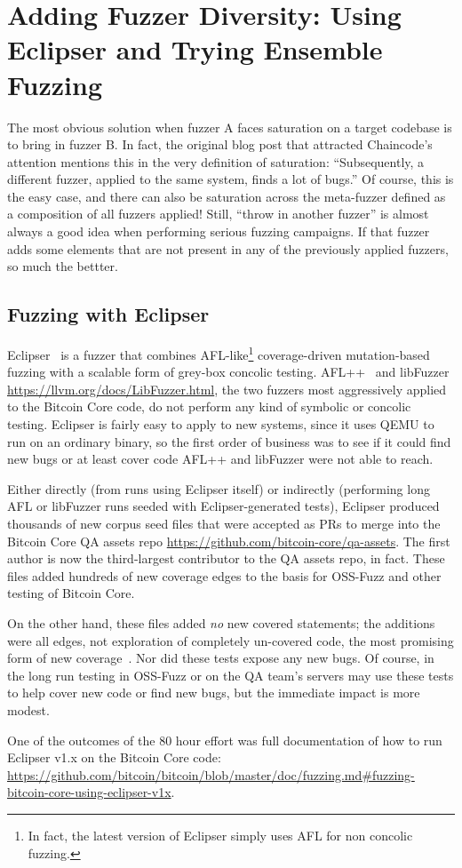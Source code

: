 \section{Adding Fuzzer Diversity: Using Eclipser and Trying Ensemble Fuzzing}

The most obvious solution when fuzzer A faces saturation on a target codebase is to bring in fuzzer B.  In fact, the original blog post that attracted Chaincode's attention mentions this in the very definition of saturation:  ``Subsequently, a different fuzzer, applied to the same system, finds a lot of bugs.''  Of course, this is the easy case, and there can also be saturation across the meta-fuzzer defined as a composition of all fuzzers applied!  Still, ``throw in another fuzzer'' is almost always a good idea when performing serious fuzzing campaigns.  If that fuzzer adds some elements that are not present in any of the previously applied fuzzers, so much the bettter.

\subsection{Fuzzing with Eclipser}

\begin{sloppypar}
Eclipser~\cite{eclipser} is a fuzzer that combines AFL-like\footnote{In fact, the latest version of Eclipser simply uses AFL for non concolic fuzzing.} coverage-driven mutation-based fuzzing with a scalable form of grey-box concolic testing.  AFL++~\cite{AFLplusplus-Woot20} and libFuzzer \url{https://llvm.org/docs/LibFuzzer.html}, the two fuzzers most aggressively applied to the Bitcoin Core code, do not perform any kind of symbolic or concolic testing.  Eclipser is fairly easy to apply to new systems, since it uses QEMU to run on an ordinary binary, so the first order of business was to see if it could find new bugs or at least cover code AFL++ and libFuzzer were not able to reach.

Either directly (from runs using Eclipser itself) or indirectly (performing long AFL or libFuzzer runs seeded with Eclipser-generated tests), Eclipser produced thousands of new corpus seed files that were accepted as PRs to merge into the Bitcoin Core QA assets repo \url{https://github.com/bitcoin-core/qa-assets}.  The first author is now the third-largest contributor to the QA assets repo, in fact.  These files added hundreds of new coverage edges to the basis for OSS-Fuzz and other testing of Bitcoin Core.

On the other hand, these files added \emph{no} new covered statements; the additions were all edges, not exploration of completely un-covered code, the most promising form of new coverage~\cite{covdev,testedness}.  Nor did these tests expose any new bugs.  Of course, in the long run testing in OSS-Fuzz or on the QA team's servers may use these tests to help cover new code or find new bugs, but the immediate impact is more modest.

  One of the outcomes of the 80 hour effort was full documentation of how to run Eclipser v1.x on the Bitcoin Core code:  \url{https://github.com/bitcoin/bitcoin/blob/master/doc/fuzzing.md#fuzzing-bitcoin-core-using-eclipser-v1x}.
\end{sloppypar}

